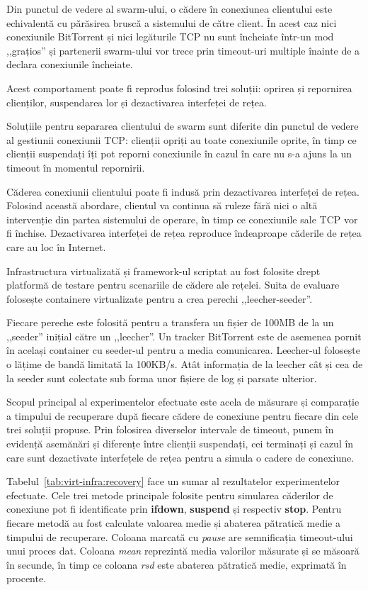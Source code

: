 Din punctul de vedere al swarm-ului, o cădere în conexiunea clientului
este echivalentă cu părăsirea bruscă a sistemului de către client.
În acest caz nici conexiunile BitTorrent și nici legăturile TCP nu sunt
încheiate într-un mod ,,grațios'' și partenerii swarm-ului vor trece
prin timeout-uri multiple înainte de a declara conexiunile încheiate.

Acest comportament poate fi reprodus folosind trei soluții: oprirea
și repornirea clienților, suspendarea lor și dezactivarea interfeței
de rețea.

Soluțiile pentru separarea clientului de swarm sunt diferite din
punctul de vedere al gestiunii conexiunii TCP: clienții opriți au toate
conexiunile oprite, în timp ce clienții suspendați îți pot reporni
conexiunile în cazul în care nu s-a ajuns la un timeout în momentul
repornirii.

Căderea conexiunii clientului poate fi indusă prin dezactivarea interfeței
de rețea. Folosind această abordare, clientul va continua să ruleze fără
nici o altă intervenție din partea sistemului de operare, în timp ce
conexiunile sale TCP vor fi închise. Dezactivarea interfeței de rețea
reproduce îndeaproape căderile de rețea care au loc în Internet.

Infrastructura virtualizată și framework-ul scriptat au fost folosite
drept platformă de testare pentru scenariile de cădere ale rețelei.
Suita de evaluare folosește containere virtualizate pentru a crea
perechi ,,leecher-seeder''.

Fiecare pereche este folosită pentru a transfera un fișier de 100MB
de la un ,,seeder'' inițial către un ,,leecher''. Un tracker BitTorrent
este de asemenea pornit în același container cu seeder-ul pentru a media
comunicarea. Leecher-ul folosește o lățime de bandă limitată la 100KB/s.
Atât informația de la leecher cât și cea de la seeder sunt colectate
sub forma unor fișiere de log și parsate ulterior.

Scopul principal al experimentelor efectuate este acela de măsurare și
comparație a timpului de recuperare după fiecare cădere de conexiune
pentru fiecare din cele trei soluții propuse. Prin folosirea diverselor
intervale de timeout, punem în evidență asemănări și diferențe între
clienții suspendați, cei terminați și cazul în care sunt dezactivate
interfețele de rețea pentru a simula o cadere de conexiune.



Tabelul~\ref{tab:virt-infra:recovery} face un sumar al rezultatelor
experimentelor efectuate. Cele trei metode principale folosite pentru
simularea căderilor de conexiune pot fi identificate prin \textbf{ifdown},
\textbf{suspend} și respectiv \textbf{stop}. Pentru fiecare metodă au
fost calculate valoarea medie și abaterea pătratică medie a timpului de 
recuperare. Coloana marcată cu \textit{pause} are semnificația timeout-ului
unui proces dat. Coloana \textit{mean} reprezintă media valorilor măsurate
și se măsoară în secunde, în timp ce coloana \textit{rsd} este abaterea
pătratică medie, exprimată în procente.

